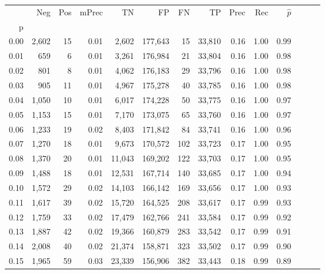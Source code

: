 \begin{tabular}{rrrrrrrrrrrrrr}
\toprule
{} &    Neg &  Pos & mPrec &       TN &       FP &      FN &      TP &  Prec &   Rec & $\hat{p}$ \\
p    &        &      &       &          &          &         &         &       &       &           \\
\midrule
0.00 &  2,602 &   15 &  0.01 &    2,602 &  177,643 &      15 &  33,810 &  0.16 &  1.00 &      0.99 \\
0.01 &    659 &    6 &  0.01 &    3,261 &  176,984 &      21 &  33,804 &  0.16 &  1.00 &      0.98 \\
0.02 &    801 &    8 &  0.01 &    4,062 &  176,183 &      29 &  33,796 &  0.16 &  1.00 &      0.98 \\
0.03 &    905 &   11 &  0.01 &    4,967 &  175,278 &      40 &  33,785 &  0.16 &  1.00 &      0.98 \\
0.04 &  1,050 &   10 &  0.01 &    6,017 &  174,228 &      50 &  33,775 &  0.16 &  1.00 &      0.97 \\
0.05 &  1,153 &   15 &  0.01 &    7,170 &  173,075 &      65 &  33,760 &  0.16 &  1.00 &      0.97 \\
0.06 &  1,233 &   19 &  0.02 &    8,403 &  171,842 &      84 &  33,741 &  0.16 &  1.00 &      0.96 \\
0.07 &  1,270 &   18 &  0.01 &    9,673 &  170,572 &     102 &  33,723 &  0.17 &  1.00 &      0.95 \\
0.08 &  1,370 &   20 &  0.01 &   11,043 &  169,202 &     122 &  33,703 &  0.17 &  1.00 &      0.95 \\
0.09 &  1,488 &   18 &  0.01 &   12,531 &  167,714 &     140 &  33,685 &  0.17 &  1.00 &      0.94 \\
0.10 &  1,572 &   29 &  0.02 &   14,103 &  166,142 &     169 &  33,656 &  0.17 &  1.00 &      0.93 \\
0.11 &  1,617 &   39 &  0.02 &   15,720 &  164,525 &     208 &  33,617 &  0.17 &  0.99 &      0.93 \\
0.12 &  1,759 &   33 &  0.02 &   17,479 &  162,766 &     241 &  33,584 &  0.17 &  0.99 &      0.92 \\
0.13 &  1,887 &   42 &  0.02 &   19,366 &  160,879 &     283 &  33,542 &  0.17 &  0.99 &      0.91 \\
0.14 &  2,008 &   40 &  0.02 &   21,374 &  158,871 &     323 &  33,502 &  0.17 &  0.99 &      0.90 \\
0.15 &  1,965 &   59 &  0.03 &   23,339 &  156,906 &     382 &  33,443 &  0.18 &  0.99 &      0.89 \\

\end{tabular}
